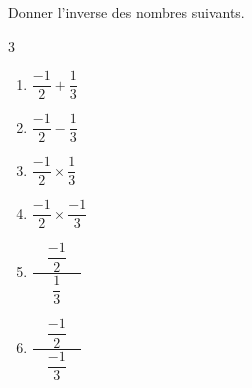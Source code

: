 \begin{exo}{}
	Donner l'inverse des nombres suivants.
	\vspace*{-2mm}
	\begin{multicols}{3}
	\begin{enumerate}
		\item $\dfrac{-1}{2} + \dfrac{1}{3}$
		\item $\dfrac{-1}{2} - \dfrac{1}{3}$
		\item $\dfrac{-1}{2} \times \dfrac{1}{3}$
		\item $\dfrac{-1}{2} \times \dfrac{-1}{3}$
		\item $\dfrac{\quad\dfrac{-1}{2}\quad}{\dfrac{1}{3}}$
		\item $\dfrac{\quad\dfrac{-1}{2}\quad}{\dfrac{-1}{3}}$
	\end{enumerate}
	\end{multicols}\vspace*{-2mm}
\end{exo}

